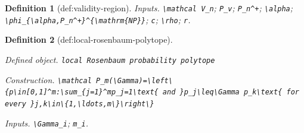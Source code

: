 \documentclass{article}
\newtheorem{definition}{Definition}
\begin{document}
\begin{definition}[def:validity-region]
\par\smallskip\noindent\emph{Inputs.} \texttt{\textbackslash{}\allowbreak{}mathcal V\_\allowbreak{}n}; \texttt{P\_\allowbreak{}v}; \texttt{P\_\allowbreak{}n\textasciicircum{}+\allowbreak{}}; \texttt{\textbackslash{}\allowbreak{}alpha}; \texttt{\textbackslash{}\allowbreak{}phi\_\allowbreak{}\{\textbackslash{}\allowbreak{}alpha,\allowbreak{}P\_\allowbreak{}n\textasciicircum{}+\allowbreak{}\}\allowbreak{}\textasciicircum{}\{\textbackslash{}\allowbreak{}mathrm\{NP\}\allowbreak{}\}\allowbreak{}}; \texttt{c}; \texttt{\textbackslash{}\allowbreak{}rho}; \texttt{r}.
\end{definition}

\begin{definition}[def:local-rosenbaum-polytope]\label{def:local-rosenbaum-polytope}
\par\smallskip\noindent\emph{Defined object.} \texttt{local Rosenbaum probability polytope}
\par\smallskip\noindent\emph{Construction.} \texttt{\textbackslash{}\allowbreak{}mathcal P\_\allowbreak{}m(\textbackslash{}\allowbreak{}Gamma)=\allowbreak{}\textbackslash{}\allowbreak{}left\textbackslash{}\allowbreak{}\{p\textbackslash{}\allowbreak{}in[0,\allowbreak{}1]\textasciicircum{}m:\allowbreak{}\textbackslash{}\allowbreak{}sum\_\allowbreak{}\{j=\allowbreak{}1\}\allowbreak{}\textasciicircum{}mp\_\allowbreak{}j=\allowbreak{}1\textbackslash{}\allowbreak{}text\{ and \}\allowbreak{}p\_\allowbreak{}j\textbackslash{}\allowbreak{}leq\textbackslash{}\allowbreak{}Gamma p\_\allowbreak{}k\textbackslash{}\allowbreak{}text\{ for every \}\allowbreak{}j,\allowbreak{}k\textbackslash{}\allowbreak{}in\textbackslash{}\allowbreak{}\{1,\allowbreak{}\textbackslash{}\allowbreak{}ldots,\allowbreak{}m\textbackslash{}\allowbreak{}\}\allowbreak{}\textbackslash{}\allowbreak{}right\textbackslash{}\allowbreak{}\}\allowbreak{}}
\par\smallskip\noindent\emph{Inputs.} \texttt{\textbackslash{}\allowbreak{}Gamma\_\allowbreak{}i}; \texttt{m\_\allowbreak{}i}.
\end{definition}
\end{document}
